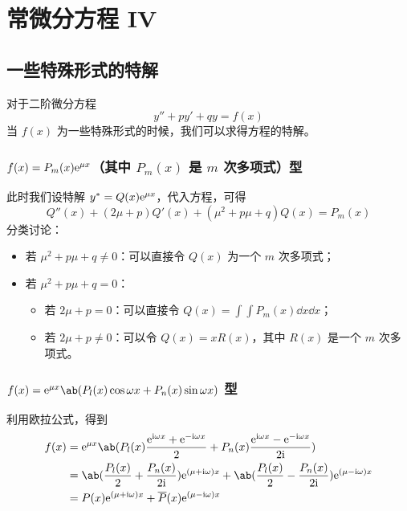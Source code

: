 \section{常微分方程 IV}

\subsection{一些特殊形式的特解}

对于二阶微分方程
$$
y'' + p y' + q y = f(x)
$$
当 $f(x)$ 为一些特殊形式的时候，我们可以求得方程的特解。

\subsubsection{$f(x) = P_m(x) \mathrm{e}^{\mu x}$（其中 $P_m(x)$ 是 $m$ 次多项式）型}

此时我们设特解 $y^* = Q(x) \mathrm{e}^{\mu x}$，代入方程，可得
$$
Q''(x) + (2\mu + p) Q'(x) + (\mu^2 + p \mu + q) Q(x) = P_m(x)
$$
分类讨论：
\begin{itemize}
    \item 若 $\mu^2 + p \mu + q \neq 0$：可以直接令 $Q(x)$ 为一个 $m$ 次多项式；
    \item 若 $\mu^2 + p \mu + q = 0$：
    \begin{itemize}
        \item 若 $2\mu + p = 0$：可以直接令 $Q(x) = \int \int P_m(x) \dd{x} \dd{x}$；
        \item 若 $2\mu + p \neq 0$：可以令 $Q(x) = x R(x)$，其中 $R(x)$ 是一个 $m$ 次多项式。
    \end{itemize}
\end{itemize}

\subsubsection{$f(x) = \E^{\mu x} \ab(P_l(x) \cos \omega x + P_n(x) \sin \omega x)$ 型}

利用欧拉公式，得到
$$
\begin{aligned}
    f(x) & = \E^{\mu x} \ab(P_l(x) \frac{\E^{\I \omega x} + \E^{-\I \omega x}}{2} + P_n(x) \frac{\E^{\I \omega x} - \E^{-\I \omega x}}{2 \I}) \\
    & = \ab(\frac{P_l(x)}{2} + \frac{P_n(x)}{2 \I}) \E^{(\mu + \I \omega) x} + \ab(\frac{P_l(x)}{2} - \frac{P_n(x)}{2 \I}) \E^{(\mu - \I \omega) x} \\
    & = P(x) \E^{(\mu + \I \omega) x} + \overline{P}(x) \E^{(\mu - \I \omega) x}
\end{aligned}
$$

